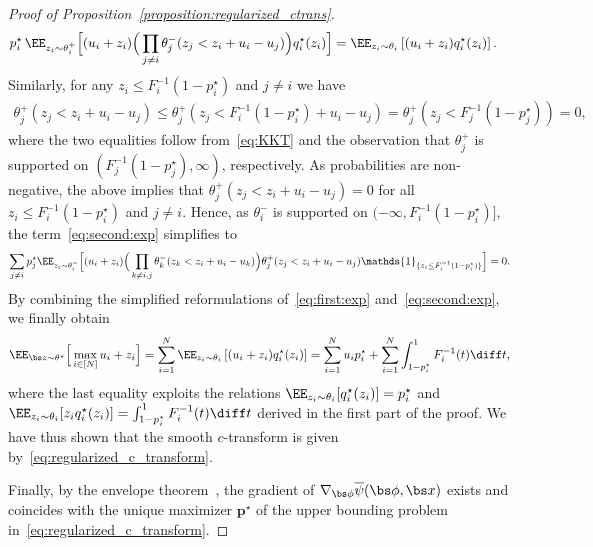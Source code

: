 \documentclass[11pt, a4paper, oneside, reqno]{article}
\begin{document}
\begin{proof}[Proof of Proposition~\ref{proposition:regularized_ctrans}]
    \begin{align}
        & p_i^\star \,\EE_{z_i \sim \theta_i^+} \Big[ (u_i + z_i) \Big( \prod_{j \neq i} \theta_j^-(z_j < z_i + u_i - u_j) \Big) q_i^\star(z_i) \Big] \notag = \EE_{z_i \sim \theta_i} \left[ (u_i + z_i) q_i^\star(z_i) \right]. \label{eq:first:term}
    \end{align}
    Similarly, for any $z_i \leq F_i^{-1}(1 - p_i^\star)$ and $j\neq i$ we have
    \begin{align*}
        \theta_j^+(z_j < z_i + u_i - u_j)
        \leq \theta_j^+(z_j < F_i^{-1}(1 - p_i^\star) + u_i - u_j)
        = \theta_j^+(z_j < F_j^{-1}(1 - p_j^\star)) = 0, 
    \end{align*}
    where the two equalities follow from~\eqref{eq:KKT} and the observation that $\theta_j^+$ is supported on $(F_j^{-1}(1 - p_j^\star), \infty)$, respectively. As probabilities are non-negative, the above implies that $\theta_j^+(z_j < z_i + u_i - u_j)=0$ for all $z_i \leq F_i^{-1}(1 - p_i^\star)$ and $j\neq i$. Hence, as $\theta_i^-$ is supported on $(-\infty, F_i^{-1}(1 - p_i^\star)]$, the term~\eqref{eq:second:exp} simplifies to
    \begin{align*}
        \sum_{j \neq i} p_j^\star \EE_{z_i \sim \theta_i^-} \Big[ (u_i + z_i) \Big( \prod_{k \neq i, j} \theta_k^-(z_k < z_i + u_i - u_k) \Big) \theta_j^+(z_j < z_i + u_i - u_j) \mathds{1}_{\{ z_i \leq F_i^{-1}(1 - p_i^\star) \}} \Big] = 0.
    \end{align*}
    By combining the simplified reformulations of~\eqref{eq:first:exp} and~\eqref{eq:second:exp}, we finally obtain
    \begin{align*}
        \EE_{\bs z \sim \theta^\star} \Big[ \max\limits_{i \in [N]} u_i + z_{i} \Big] 
	    = \sum_{i=1}^N \EE_{z_i \sim \theta_i} \left[ ( u_i + z_i) q_i^\star(z_i) \right] = \sum_{i=1}^N u_i p_i^\star + \sum_{i=1}^N \int_{1-p_i^\star}^1 F_i^{-1}(t) \diff t,
    \end{align*}
    where the last equality exploits the relations $\EE_{z_i \sim \theta_i} [q_i^\star(z_i)] = p_i^\star$ and $\EE_{z_i \sim \theta_i}[z_i q_i^\star(z_i)] = \int_{1 - p_i^\star}^1 F_i^{-1}(t) \diff t$ derived in the first part of the proof. We have thus shown that the smooth $c$-transform is given by~\eqref{eq:regularized_c_transform}.

    Finally, by the envelope theorem~\citep[Theorem~2.16]{de2000mathematical}, the gradient of $\nabla_{\bs \phi}\overline \psi(\bs \phi, \bs x)$ exists and coincides with the unique maximizer $\bm p^\star$ of the upper bounding problem in~\eqref{eq:regularized_c_transform}.
    \end{proof}
	
\end{document}

